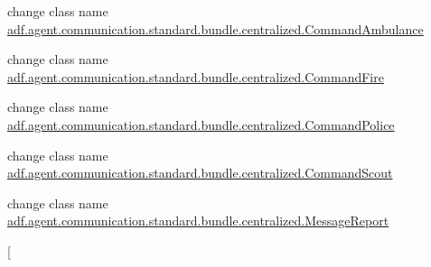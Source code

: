 
\begin{DoxyRefList}
\item[\label{deprecated__deprecated000001}%
\hypertarget{deprecated__deprecated000001}{}%
Class \hyperlink{classadf_1_1agent_1_1communication_1_1standard_1_1bundle_1_1topdown_1_1CommandAmbulance}{adf.agent.communication.standard.bundle.topdown.Command\+Ambulance} ]change class name \hyperlink{classadf_1_1agent_1_1communication_1_1standard_1_1bundle_1_1centralized_1_1CommandAmbulance}{adf.\+agent.\+communication.\+standard.\+bundle.\+centralized.\+Command\+Ambulance}  
\item[\label{deprecated__deprecated000002}%
\hypertarget{deprecated__deprecated000002}{}%
Class \hyperlink{classadf_1_1agent_1_1communication_1_1standard_1_1bundle_1_1topdown_1_1CommandFire}{adf.agent.communication.standard.bundle.topdown.Command\+Fire} ]change class name \hyperlink{classadf_1_1agent_1_1communication_1_1standard_1_1bundle_1_1centralized_1_1CommandFire}{adf.\+agent.\+communication.\+standard.\+bundle.\+centralized.\+Command\+Fire}  
\item[\label{deprecated__deprecated000003}%
\hypertarget{deprecated__deprecated000003}{}%
Class \hyperlink{classadf_1_1agent_1_1communication_1_1standard_1_1bundle_1_1topdown_1_1CommandPolice}{adf.agent.communication.standard.bundle.topdown.Command\+Police} ]change class name \hyperlink{classadf_1_1agent_1_1communication_1_1standard_1_1bundle_1_1centralized_1_1CommandPolice}{adf.\+agent.\+communication.\+standard.\+bundle.\+centralized.\+Command\+Police}  
\item[\label{deprecated__deprecated000004}%
\hypertarget{deprecated__deprecated000004}{}%
Class \hyperlink{classadf_1_1agent_1_1communication_1_1standard_1_1bundle_1_1topdown_1_1CommandScout}{adf.agent.communication.standard.bundle.topdown.Command\+Scout} ]change class name \hyperlink{classadf_1_1agent_1_1communication_1_1standard_1_1bundle_1_1centralized_1_1CommandScout}{adf.\+agent.\+communication.\+standard.\+bundle.\+centralized.\+Command\+Scout}  
\item[\label{deprecated__deprecated000005}%
\hypertarget{deprecated__deprecated000005}{}%
Class \hyperlink{classadf_1_1agent_1_1communication_1_1standard_1_1bundle_1_1topdown_1_1MessageReport}{adf.agent.communication.standard.bundle.topdown.Message\+Report} ]change class name \hyperlink{classadf_1_1agent_1_1communication_1_1standard_1_1bundle_1_1centralized_1_1MessageReport}{adf.\+agent.\+communication.\+standard.\+bundle.\+centralized.\+Message\+Report}  
\item[\label{deprecated__deprecated000006}%

\end{DoxyRefList}
